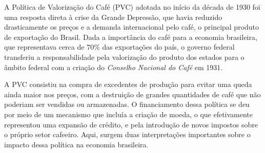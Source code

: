 \documentclass[a4paper,12pt]{article}[abntex2]
\begin{document}
A Política de Valorização do Café (PVC) adotada no início da década de 1930 foi uma resposta direta à crise da Grande Depressão, que havia reduzido drasticamente os preços e a demanda internacional pelo café, o principal produto de exportação do Brasil. Dada a importância do café para a economia brasileira, que representava cerca de 70\% das exportações do país, o governo federal transferiu a responsabilidade pela valorização do produto dos estados para o âmbito federal com a criação do \textit{Conselho Nacional do Café} em 1931.

A PVC consistiu na compra de excedentes de produção para evitar uma queda ainda maior nos preços, com a destruição de grandes quantidades de café que não poderiam ser vendidas ou armazenadas. O financiamento dessa política se deu por meio de um mecanismo que incluía a criação de moeda, o que efetivamente representou uma expansão de crédito, e pela introdução de novos impostos sobre o próprio setor cafeeiro. Aqui, surgem duas interpretações importantes sobre o impacto dessa política na economia brasileira.
\end{document}
